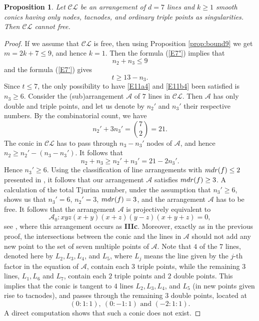 \documentclass[12pt]{amsart}
\theoremstyle{plain}
\newtheorem{prop}[subsection]{Proposition}
\theoremstyle{definition}
\numberwithin{equation}{section}
\newcommand{\A}{{\mathcal A}}
\begin{document}
\begin{prop}
\label{prop11d}
Let $\mathcal{CL}$ be an arrangement of $d = 7$ lines and $k \geq 1$ smooth conics having only nodes, tacnodes, and ordinary triple points as singularities. Then $\mathcal{CL}$ cannot free.
\end{prop}
\begin{proof}
If we assume that $\mathcal{CL}$ is free, then using Proposition \ref{prop:bound9} we get $m=2k+7 \leq 9$, and hence $k=1$.
Then the formula (\ref{E7"}) implies that
\begin{equation}
\label{E11a4}
n_2+ n_3 \leq 9
\end{equation}
and the formula (\ref{E7'}) gives
\begin{equation}
\label{E11b4}
t \geq 13-n_3.
\end{equation}
Since $t \leq 7$, the only possibility to have \eqref{E11a4} and \eqref{E11b4} been satisfied is $n_3 \geq 6$.
Consider the (sub)arrangement $\mathcal{A}$ of $7$ lines in $\mathcal{CL}$. Then $\mathcal{A}$ has only double and triple points, and let us denote by $n_2'$ and $n_3'$ their respective numbers. By the combinatorial count, we have
\begin{equation}
\label{E11d4}
n_2' + 3n_3' = \binom{7}{2} = 21.
\end{equation}
The conic in $\mathcal{CL}$ has to pass through $n_3-n_3'$ nodes of $\mathcal{A}$, and hence $n_2 \geq n_2'-(n_3-n_3')$. It follows that
$$n_2+n_3 \geq n_2'+n_3' =21-2n_3'.$$
Hence $n_3' \geq 6$. Using the classification of line arrangements with ${\rm mdr}(f) \leq 2$ presented in \cite{BT}, it follows that our arrangement $\mathcal{A}$ satisfies ${\rm mdr}(f) \geq 3$. A calculation of the total Tjurina number, under the assumption that $n_3' \geq 6$, shows us that $n_3' = 6$, $n_2' = 3$, ${\rm mdr}(f)=3$, and the arrangement $\mathcal{A}$ has to be free.
It follows that the arrangement $\mathcal{A}$ is projectively equivalent to
$$\A_0: xyz(x+y)(x+z)(y-z)(x+y+z)=0,$$
see \cite[Theorem 2.6]{BT}, where this arrangement occurs as \textbf{IIIc}. Moreover, exactly as in the previous proof, the intersections between the conic and the lines in $\mathcal{A}$ should not add any new point to the set of seven multiple points of $\A$. Note that $4$ of the $7$ lines, denoted here by $L_2,L_3,L_4$, and $L_5$, where $L_j$ means the line given by the $j$-th factor in the equation of $\mathcal{A}$, contain each $3$ triple points, while the remaining $3$ lines, $L_1, L_6$ and $L_7$, contain each $2$ triple points and $2$ double points. 
This implies that the conic is tangent to $4$ lines $L_2,L_3,L_4$, and $L_5$ (in new points given rise to tacnodes), and passes through the remaining $3$ double points, located at 
$$(0:1:1), \ (0:-1:1) \text{ and } (-2:1:1). $$
A direct computation shows that such a conic does not exist.
\end{proof}
\end{document}

